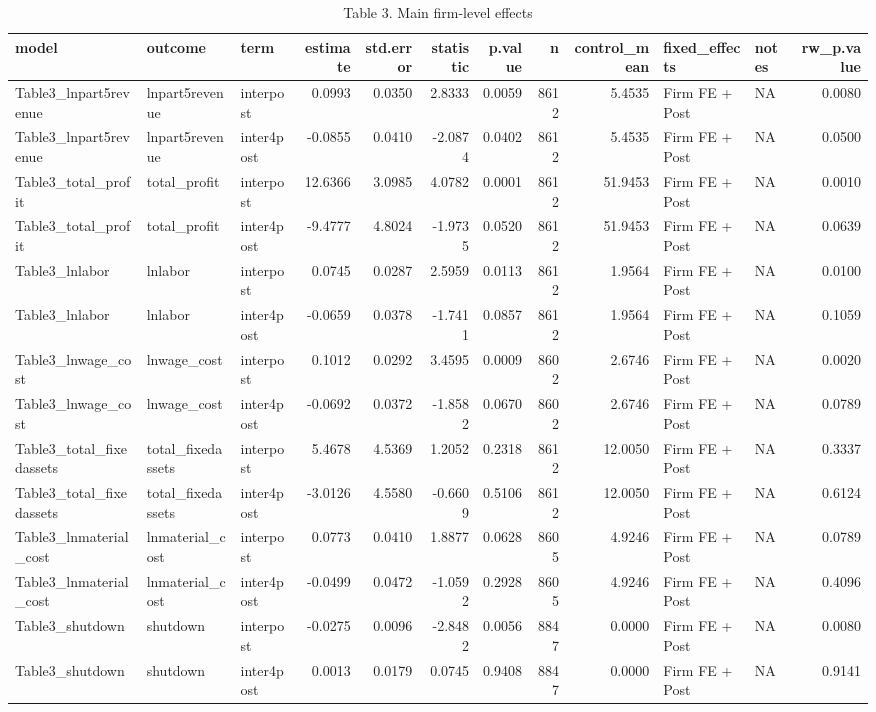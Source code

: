 \begin{table}

\caption{Table 3. Main firm-level effects}
\centering
\begin{tabular}[t]{lllrrrrrrllr}
\toprule
model & outcome & term & estimate & std.error & statistic & p.value & n & control\_mean & fixed\_effects & notes & rw\_p.value\\
\midrule
Table3\_lnpart5revenue & lnpart5revenue & interpost & 0.0993 & 0.0350 & 2.8333 & 0.0059 & 8612 & 5.4535 & Firm FE + Post & NA & 0.0080\\
Table3\_lnpart5revenue & lnpart5revenue & inter4post & -0.0855 & 0.0410 & -2.0874 & 0.0402 & 8612 & 5.4535 & Firm FE + Post & NA & 0.0500\\
Table3\_total\_profit & total\_profit & interpost & 12.6366 & 3.0985 & 4.0782 & 0.0001 & 8612 & 51.9453 & Firm FE + Post & NA & 0.0010\\
Table3\_total\_profit & total\_profit & inter4post & -9.4777 & 4.8024 & -1.9735 & 0.0520 & 8612 & 51.9453 & Firm FE + Post & NA & 0.0639\\
Table3\_lnlabor & lnlabor & interpost & 0.0745 & 0.0287 & 2.5959 & 0.0113 & 8612 & 1.9564 & Firm FE + Post & NA & 0.0100\\
\addlinespace
Table3\_lnlabor & lnlabor & inter4post & -0.0659 & 0.0378 & -1.7411 & 0.0857 & 8612 & 1.9564 & Firm FE + Post & NA & 0.1059\\
Table3\_lnwage\_cost & lnwage\_cost & interpost & 0.1012 & 0.0292 & 3.4595 & 0.0009 & 8602 & 2.6746 & Firm FE + Post & NA & 0.0020\\
Table3\_lnwage\_cost & lnwage\_cost & inter4post & -0.0692 & 0.0372 & -1.8582 & 0.0670 & 8602 & 2.6746 & Firm FE + Post & NA & 0.0789\\
Table3\_total\_fixedassets & total\_fixedassets & interpost & 5.4678 & 4.5369 & 1.2052 & 0.2318 & 8612 & 12.0050 & Firm FE + Post & NA & 0.3337\\
Table3\_total\_fixedassets & total\_fixedassets & inter4post & -3.0126 & 4.5580 & -0.6609 & 0.5106 & 8612 & 12.0050 & Firm FE + Post & NA & 0.6124\\
\addlinespace
Table3\_lnmaterial\_cost & lnmaterial\_cost & interpost & 0.0773 & 0.0410 & 1.8877 & 0.0628 & 8605 & 4.9246 & Firm FE + Post & NA & 0.0789\\
Table3\_lnmaterial\_cost & lnmaterial\_cost & inter4post & -0.0499 & 0.0472 & -1.0592 & 0.2928 & 8605 & 4.9246 & Firm FE + Post & NA & 0.4096\\
Table3\_shutdown & shutdown & interpost & -0.0275 & 0.0096 & -2.8482 & 0.0056 & 8847 & 0.0000 & Firm FE + Post & NA & 0.0080\\
Table3\_shutdown & shutdown & inter4post & 0.0013 & 0.0179 & 0.0745 & 0.9408 & 8847 & 0.0000 & Firm FE + Post & NA & 0.9141\\
\bottomrule
\end{tabular}
\end{table}
